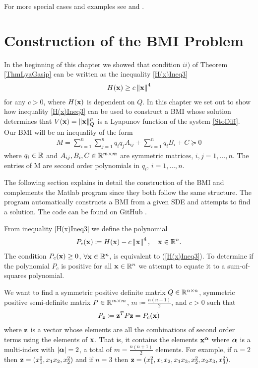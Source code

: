 \documentclass[a4paper,12pt,twoside,BCOR=10mm]{scrbook}
\begin{document}
For more special cases and examples see \citep{HGGS2018localLya} and \citep{sdestab2012khaminskii}.

\section{Construction of the BMI Problem}
In the beginning of this chapter we showed that condition $ii)$ of Theorem \ref{ThmLyaGasip} can be written as the inequality \eqref{H(x)Ineq3}
\begin{align*}
    H(\mathbf{x}) \geq c\left\lVert\mathbf{x}\right\rVert^4
\end{align*}
for any $c > 0$, where $H(\mathbf{x})$ is dependent on $Q$.
In this chapter we set out to show how inequality \eqref{H(x)Ineq3} can be used to construct a BMI whose solution determines that $V(\mathbf{x}) = \left\lVert\mathbf{x}\right\rVert_Q^p$ is a Lyapunov function of the system \eqref{StoDiff}. Our BMI will be an inequality of the form
\begin{align*}
    M = \sum_{i = 1}^n \sum_{j = 1}^n q_iq_j A_{ij} + \sum_{i = 1}^n q_i B_i + C \succeq 0
\end{align*}
where $q_i \in \mathbb{R}^{}$ and $A_{ij}, B_i, C \in \mathbb{R}^{m \times m}$ are symmetric matrices, $i,j = 1, \ldots, n$. The entries of M are second order polynomials in $q_i$, $i = 1, \ldots, n$.

The following section explains in detail the construction of the BMI and complements the Matlab program since they both follow the same structure. The program automatically constructs a BMI from a given SDE and attempts to find a solution. The code can be found on GitHub \citep{Mverk2022}.

From inequality \eqref{H(x)Ineq3} we define the polynomial
\begin{align}\label{P_c definition}
    P_c(\mathbf{x}) \coloneqq H(\mathbf{x}) - c\left\lVert\mathbf{x}\right\rVert_{}^{4}, \quad \mathbf{x}\in \mathbb{R}^{n}.
\end{align}
The condition $P_c(\mathbf{x}) \geq 0$, $\forall \mathbf{x} \in \mathbb{R}^{n}$, is equivalent to (\ref{H(x)Ineq3}). To determine if the polynomial $P_c$ is positive for all $\mathbf{x} \in \mathbb{R}^{n}$ we attempt to equate it to a sum-of-squares polynomial.

We want to find a symmetric positive definite matrix $Q\in \mathbb{R}^{n\times n}$, symmetric positive semi-definite matrix $P \in \mathbb{R}^{m \times m}$, $m \coloneqq \frac{n(n + 1)}{2}$, and $c > 0$ such that
\begin{align*}
    P_{\mathbf{z}} \coloneqq \mathbf{z}^T P \mathbf{z} = P_c(\mathbf{x})
\end{align*}
where $\mathbf{z}$ is a vector whose elements are all the combinations of second order terms using the elements of $\mathbf{x}$. That is, it contains the elements $\mathbf{x}^{\bm{\alpha}}$ where $\bm{\alpha}$ is a multi-index with $|\bm{\alpha}| = 2$, a total of $m = \frac{n(n + 1)}{2}$ elements. For example, if $n = 2$ then $\mathbf{z} = (x_1^2, x_1x_2, x_2^2)$ and if $n = 3$ then $\mathbf{z} = (x_1^2, x_1x_2, x_1x_3, x_2^2, x_2x_3, x_3^2)$.
\end{document}
